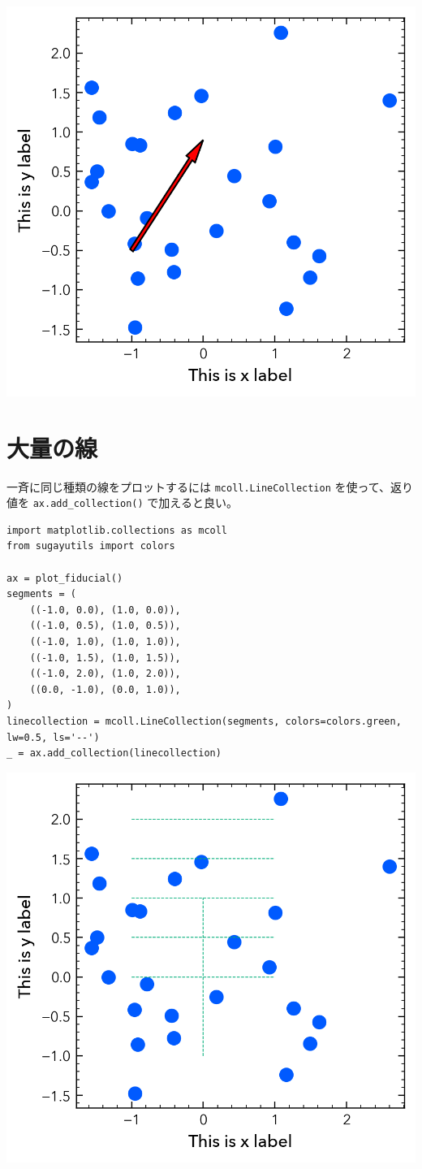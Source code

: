 \documentclass[a4paper, 10pt, notitlepage, twocolumn, uplatex, oneside, dvipdfmx]{jsarticle}
\begin{document}
\begin{center}
\includegraphics[width=1.0\linewidth]{./obipy-resources/params_arrow.png}
\end{center}
\section{大量の線}
\label{sec:org4dddadb}
一斉に同じ種類の線をプロットするには \texttt{mcoll.LineCollection} を使って、返り値を \texttt{ax.add\_collection()} で加えると良い。
\begin{verbatim}
import matplotlib.collections as mcoll
from sugayutils import colors

ax = plot_fiducial()
segments = (
    ((-1.0, 0.0), (1.0, 0.0)),
    ((-1.0, 0.5), (1.0, 0.5)),
    ((-1.0, 1.0), (1.0, 1.0)),
    ((-1.0, 1.5), (1.0, 1.5)),
    ((-1.0, 2.0), (1.0, 2.0)),
    ((0.0, -1.0), (0.0, 1.0)),
)
linecollection = mcoll.LineCollection(segments, colors=colors.green, lw=0.5, ls='--')
_ = ax.add_collection(linecollection)
\end{verbatim}

\begin{center}
\includegraphics[width=1.0\linewidth]{./obipy-resources/params_lines.png}
\end{center}
\end{document}
